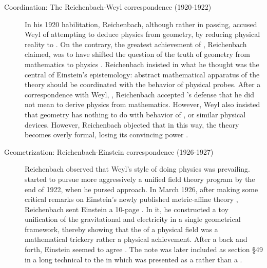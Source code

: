 \documentclass[draft]{article}
\newcommand{\PRZL}{\citetitle{Reichenbach1928}\xspace}
\begin{document}
\begin{description}
\item[Coordination: The Reichenbach-Weyl correspondence (1920-1922)]\label{reichenbachweyl} In his 1920 habilitation, Reichenbach, although rather in passing, accused Weyl of attempting to deduce physics from geometry, by reducing physical reality to  \citep[73]{Reichenbach1920a}. On the contrary, the greatest achievement of \gr, Reichenbach claimed, was to have shifted the question of the truth of geometry from mathematics to physics \citep[73]{Reichenbach1920a}. Reichenbach insisted in what he thought was the central of Einstein's epistemology: abstract mathematical apparatus of the theory should be coordinated with the behavior of physical probes. After a  correspondence with Weyl, \citet[367--368]{Reichenbach1921}, Reichenbach accepted 's defense that he did not mean to derive physics from mathematics. However, Weyl also insisted that \spti geometry has nothing to do with behavior of \rac, or similar physical devices. However, Reichenbach objected that in this way, the theory becomes overly formal, losing its convincing power \citep[367]{Reichenbach1921}.

\item[Geometrization: Reichenbach-Einstein correspondence (1926-1927)]\label{reichenbacheinsteinI} Reichenbach observed that Weyl's style of doing physics was prevailing.  started to pursue more aggressively a unified field theory program by the end of 1922, when he pursed  approach. In March 1926, after making some critical remarks on Einstein's newly published metric-affine theory \citep{Einstein1925a}, Reichenbach sent Einstein a 10-page  \citep{Reichenbach1926f}. In it, he constructed a toy unification of the gravitational and electricity in a single geometrical framework, thereby showing that the  of a physical field was a mathematical trickery rather a physical achievement. After a back and forth, Einstein seemed to agree \citep{Lehmkuhl2014}. The note was later included as section \S49 in a long technical \Ap to the \PRZL \citep[-50]{Reichenbach1928} in which \gr was presented as a  rather than a  \citep{Giovanelli2020}. 


\end{description}
\end{document}
